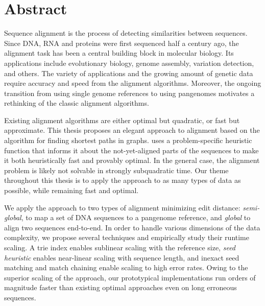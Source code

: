 \begingroup
\let\clearpage\relax
\let\cleardoublepage\relax
\let\cleardoublepage\relax

\chapter*{Abstract}

Sequence alignment is the process of detecting similarities between sequences.
Since DNA, RNA and proteins were first sequenced half a century ago, the
alignment task has been a central building block in molecular biology. Its
applications include evolutionary biology, genome assembly, variation detection,
and others. The variety of applications and the growing amount of genetic data
require accuracy and speed from the alignment algorithms. Moreover, the ongoing
transition from using single genome references to using pangenomes motivates a
rethinking of the classic alignment algorithms.

Existing alignment algorithms are either optimal but quadratic, or fast but
approximate. This thesis proposes an elegant approach to alignment based on the
\A algorithm for finding shortest paths in graphs. \A uses a problem-specific
heuristic function that informs it about the not-yet-aligned parts of the
sequences to make it both heuristically fast and provably optimal. In the
general case, the alignment problem is likely not solvable in strongly
subquadratic time. Our theme throughout this thesis is to apply the \A approach
to as many types of data as possible, while remaining fast and optimal.

We apply the \A approach to two types of alignment minimizing edit distance:
\emph{semi-global}, to map a set of DNA sequences to a pangenome reference, and
\emph{global} to align two sequences end-to-end. In order to handle various
dimensions of the data complexity, we propose several techniques and empirically
study their runtime scaling. A trie index enables sublinear scaling with the
reference size, \emph{seed heuristic} enables near-linear scaling with sequence
length, and inexact seed matching and match chaining enable scaling to high
error rates. Owing to the superior scaling of the \A approach, our prototypical
implementations run orders of magnitude faster than existing optimal approaches
even on long erroneous sequences.

